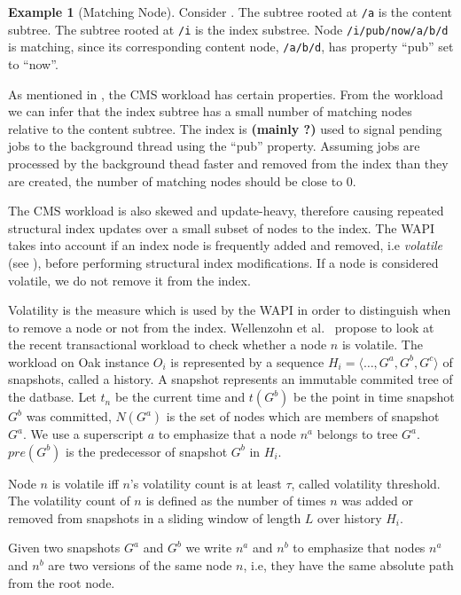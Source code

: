 \documentclass[abstracton,12pt]{scrartcl}
\theoremstyle{definition}
\newtheorem{example}{Example}
\begin{document}
\begin{example}[Matching Node]
  Consider . The subtree rooted at \texttt{/a} is
  the content subtree. The subtree rooted at \texttt{/i} is the index
  substree. Node \texttt{/i/pub/now/a/b/d} is matching, since its corresponding
  content node, \texttt{/a/b/d}, has property ``pub'' set to ``now''.
\end{example}

As mentioned in , the CMS workload has certain
properties. From the workload we can infer that the index subtree has a small number of
matching nodes relative to the content subtree. The index is
\textbf{(mainly ?)} used to signal pending jobs to the background thread using
the ``pub'' property. Assuming jobs are processed by
the background thead faster and removed from the index than they are created,
the number of matching nodes should be close to $0$.  

The CMS workload is also skewed and update-heavy, therefore causing repeated structural index
updates over a small subset of nodes to the index.
The WAPI takes into account if an index node is frequently added and removed,
i.e \textit{volatile} (see ), before performing structural
index modifications. If a node is considered volatile, we do not remove it from the index.

Volatility is the measure which is used by the WAPI in order to distinguish
when to remove a node or not from the index.
Wellenzohn et al.~\cite{KW17} propose to look at the recent transactional
workload to check whether a node $n$ is volatile. The workload on Oak instance
$O_i$ is represented by a sequence $H_i = \langle \ldots, G^a, G^b, G^c
\rangle$ of snapshots, called a history. A snapshot represents an immutable
commited tree of the datbase. Let $t_n$ be the current time and
$t(G^b)$ be the point in time snapshot $G^b$ was committed, $N(G^a)$ is the
set of nodes which are members of snapshot $G^a$. We use a superscript $a$
to emphasize that a node $n^a$ belongs to tree $G^a$. $pre(G^b)$ is the
predecessor of snapshot $G^b$ in $H_i$.

Node $n$ is volatile iff $n$'s volatility count is at least $\tau$, called
volatility threshold. The volatility count of $n$ is defined as the number of
times $n$ was added or removed from snapshots in a sliding window of length
$L$ over history $H_i$.

Given two snapshots $G^a$ and $G^b$ we write $n^a$ and $n^b$ to emphasize that
nodes $n^a$ and $n^b$ are two versions of the same node $n$, i.e, they have
the same absolute path from the root node.
\end{document}
